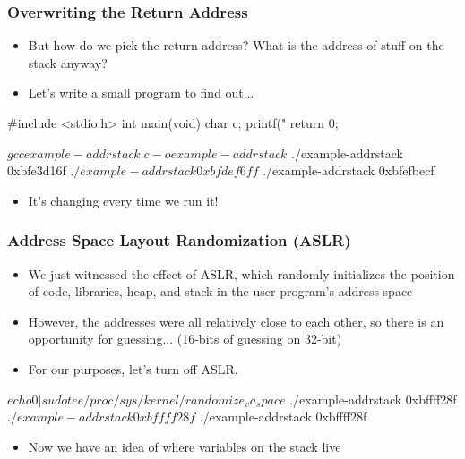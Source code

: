 \documentclass[11pt,xcolor=dvipsnames]{beamer}
\newcommand{\vs}{\vspace{0.5em}}
\newcommand{\mvs}{\vspace{-0.95em}}
\begin{document}
\begin{frame}[fragile,t]
\frametitle{Overwriting the Return Address}
\mvs
\begin{itemize}
  \item But how do we pick the return address? What is the address of stuff on the stack anyway?
  \pause
  \item Let's write a small program to find out...
\end{itemize}
\begin{ccode}
#include <stdio.h>
int main(void) {
  char c;
  printf("%
  return 0;
}
\end{ccode}
\begin{textcode}
$ gcc example-addrstack.c -o example-addrstack
$ ./example-addrstack
0xbfe3d16f
$ ./example-addrstack
0xbfdef6ff
$ ./example-addrstack
0xbfefbecf
\end{textcode}
\pause
\begin{itemize}
  \item It's changing every time we run it!
\end{itemize}
\end{frame}

\begin{frame}[fragile,t]
\frametitle{Address Space Layout Randomization (ASLR)}
\begin{itemize}
  \item We just witnessed the effect of ASLR, which randomly initializes the position of code, libraries, heap, and stack in the user program's address space
  \item However, the addresses were all relatively close to each other, so there is an opportunity for guessing... (16-bits of guessing on 32-bit)
\pause
  \item For our purposes, let's turn off ASLR.
\end{itemize}
\vs
\begin{textcode}
$ echo 0 | sudo tee /proc/sys/kernel/randomize_va_space
$ ./example-addrstack
0xbffff28f
$ ./example-addrstack
0xbffff28f
$ ./example-addrstack
0xbffff28f
\end{textcode}
\begin{itemize}
  \item Now we have an idea of where variables on the stack live
\end{itemize}
\end{frame}
\end{document}
